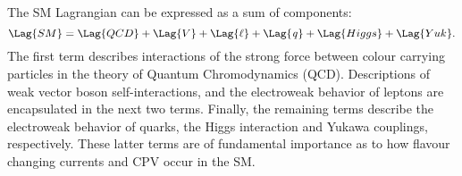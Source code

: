 The SM Lagrangian can be expressed as a sum of components:
\begin{equation}
  \Lag{SM} = \Lag{QCD} + \Lag{V} + \Lag{\ell} + \Lag{\it q} + \Lag{Higgs} + \Lag{Yuk}.
  \label{eq:th:lag}
\end{equation}
The first term describes interactions of the strong force between colour carrying particles in the
theory of Quantum Chromodynamics (QCD).
Descriptions of weak vector boson self-interactions, and the electroweak behavior of
leptons are encapsulated in the next two terms.
Finally, the remaining terms describe the electroweak behavior of quarks, the Higgs interaction and Yukawa
couplings, respectively.
These latter terms are of fundamental importance as to how flavour changing currents and CPV
occur in the SM. %



